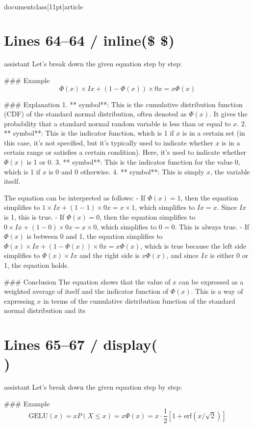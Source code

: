 \\documentclass[11pt]{article}
\begin{document}
\section*{Lines 64–64 / inline(\$ \$) }
assistant
Let's break down the given equation step by step:

### Example
\[
\Phi(x) \times Ix + (1 - \Phi(x)) \times 0x = x \Phi(x)
\]

### Explanation
1. ** symbol**: This is the cumulative distribution function (CDF) of the standard normal distribution, often denoted as \(\Phi(x)\). It gives the probability that a standard normal random variable is less than or equal to \(x\).
2. ** symbol**: This is the indicator function, which is 1 if \(x\) is in a certain set (in this case, it's not specified, but it's typically used to indicate whether \(x\) is in a certain range or satisfies a certain condition). Here, it's used to indicate whether \(\Phi(x)\) is 1 or 0.
3. ** symbol**: This is the indicator function for the value 0, which is 1 if \(x\) is 0 and 0 otherwise.
4. ** symbol**: This is simply \(x\), the variable itself.

The equation can be interpreted as follows:
- If \(\Phi(x) = 1\), then the equation simplifies to \(1 \times Ix + (1 - 1) \times 0x = x \times 1\), which simplifies to \(Ix = x\). Since \(Ix\) is 1, this is true.
- If \(\Phi(x) = 0\), then the equation simplifies to \(0 \times Ix + (1 - 0) \times 0x = x \times 0\), which simplifies to \(0 = 0\). This is always true.
- If \(\Phi(x)\) is between 0 and 1, the equation simplifies to \(\Phi(x) \times Ix + (1 - \Phi(x)) \times 0x = x \Phi(x)\), which is true because the left side simplifies to \(\Phi(x) \times Ix\) and the right side is \(x \Phi(x)\), and since \(Ix\) is either 0 or 1, the equation holds.

### Conclusion
The equation shows that the value of \(x\) can be expressed as a weighted average of itself and the indicator function of \(\Phi(x)\). This is a way of expressing \(x\) in terms of the cumulative distribution function of the standard normal distribution and its


\section*{Lines 65–67 / display(\\[ \\]) }
assistant
Let's break down the given equation step by step:

### Example
\[
\text{GELU}(x) = xP(X \le x) = x\Phi(x) = x \cdot \frac{1}{2}\left[1 + \text{erf}(x/\sqrt{2})\right]
\]
\end{document}
